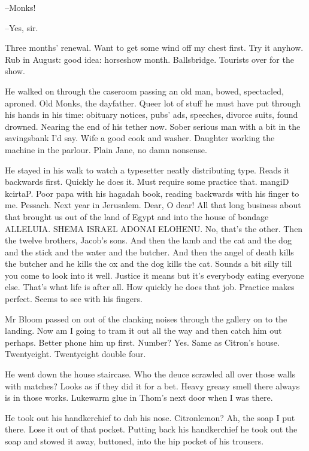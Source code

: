 --Monks!

--Yes, sir.

Three months' renewal.
Want to get some wind off my chest first.
Try it anyhow.
Rub in August:
good idea: horseshow month.
Ballsbridge.
Tourists over for the show.



He walked on through the caseroom
passing an old man, bowed, spectacled, aproned.
Old Monks, the dayfather.
Queer lot of stuff he must have put through his hands in his time:
obituary notices, pubs' ads, speeches, divorce suits, found drowned.
Nearing the end of his tether now.
Sober serious man with a bit in the savingsbank I'd say.
Wife a good cook and washer.
Daughter working the machine in the parlour.
Plain Jane, no damn nonsense.



He stayed in his walk to watch a typesetter
neatly distributing type.
Reads it backwards first.
Quickly he does it.
Must require some practice that.
mangiD kcirtaP.
Poor papa with his hagadah book,
reading backwards with his finger to me.
Pessach.
Next year in Jerusalem.
Dear, O dear!
All that long business about that brought us out of the land of Egypt
and into the house of bondage ALLELUIA.
SHEMA ISRAEL ADONAI ELOHENU.
No, that's the other.
Then the twelve brothers, Jacob's sons.
And then the lamb and the cat and the dog
and the stick and the water and the butcher.
And then the angel of death kills the butcher
and he kills the ox and the dog kills the cat.
Sounds a bit silly till you come to look into it well.
Justice it means but it's everybody eating everyone else.
That's what life is after all.
How quickly he does that job.
Practice makes perfect.
Seems to see with his fingers.

Mr Bloom passed on out of the clanking noises
through the gallery on to the landing.
Now am I going to tram it out all the way and then catch him out perhaps.
Better phone him up first.
Number?
Yes.
Same as Citron's house.
Twentyeight.
Twentyeight double four.



He went down the house staircase.
Who the deuce scrawled all over those walls with matches?
Looks as if they did it for a bet.
Heavy greasy smell there always is in those works.
Lukewarm glue in Thom's next door when I was there.

He took out his handkerchief to dab his nose.
Citronlemon?
Ah, the soap I put there.
Lose it out of that pocket.
Putting back his handkerchief
he took out the soap and stowed it away,
buttoned,
into the hip pocket of his trousers.

